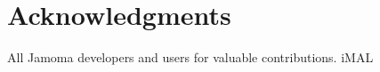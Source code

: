 \documentclass{sig-alternate}
\begin{document}

\section{Acknowledgments} %
\label{sec:acknowledgments}

All Jamoma developers and users for valuable contributions. 
iMAL





%

%


\balancecolumns %
\end{document}
